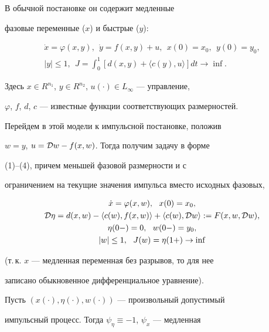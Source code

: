 \begin{exam}


В обычной постановке он содержит медленные


фазовые переменные ($x$) и быстрые ($y$):


\begin{gather*}


\Dot x =\varphi(x,y), \ \ \Dot y=f(x,y)+u, \ \ x(0)=x_0,\ \ y(0)=y_0,\\


|y| \le 1, \ \ J=\int_0^1[d(x,y)+\langle c(y),u\rangle]dt \to \inf.


\end{gather*}


Здесь $x\in R^{n_1}$, $y\in R^{n_2}$, $u(\cdot)\in L_\infty$ --- управление,


$\varphi$, $f$, $d$, $c$ --- известные функции соответствующих размерностей.





Перейдем в этой модели к импульсной постановке, положив


$w=y$, $u= {\cal D}w-f(x,w)$. Тогда получим задачу в форме


(1)--(4), причем меньшей фазовой размерности и с 


ограничением на текущие значения импульса вместо исходных фазовых,


\begin{gather*}


\Dot x = \varphi(x,w), \ \ x(0) = x_0,\\


{\cal D} \eta = d(x,w)- \langle c(w),f(x,w) \rangle +


\langle c(w),{\cal D}w \rangle :=F(x,w,{\cal D}w),\\


\eta (0-)=0,  \ \ w(0-) = y_0,\\


|w|\le 1, \ \ J(w)=\eta (1+) \to \inf


\end{gather*}


(т.\,к. $x$ --- медленная переменная без разрывов, то для нее


записано обыкновенное дифференциальное уравнение).





Пусть $(x(\cdot),\eta(\cdot),w(\cdot))$ --- произвольный допустимый 


импульсный процесс. Тогда $\psi_\eta \equiv -1$, $\psi_x$ --- медленная 



\end{exam}
